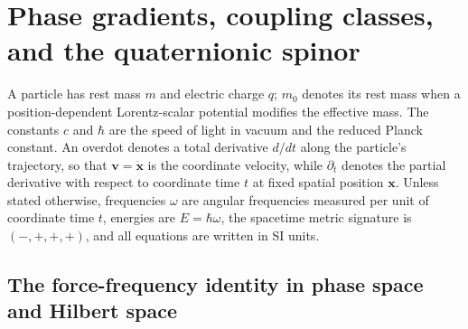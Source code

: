 \documentclass[aps,prd,onecolumn,tightenlines,nofootinbib,notitlepage,11pt,floatfix]{revtex4-2}
\theoremstyle{indentedtheorem}
\begin{document}
\section{Phase gradients, coupling classes, and the quaternionic spinor}
\label{sec:foundations}

A particle has rest mass $m$ and electric charge $q$; $m_0$ denotes its rest mass when a position-dependent Lorentz-scalar potential modifies the effective mass. The constants $c$ and $\hbar$ are the speed of light in vacuum and the reduced Planck constant. An overdot denotes a total derivative $d/dt$ along the particle's trajectory, so that $\mathbf{v}=\dot{\mathbf{x}}$ is the coordinate velocity, while $\partial_t$ denotes the partial derivative with respect to coordinate time $t$ at fixed spatial position $\mathbf{x}$. Unless stated otherwise, frequencies $\omega$ are angular frequencies measured per unit of coordinate time $t$, energies are $E=\hbar\omega$, the spacetime metric signature is $(-,+,+,+)$, and all equations are written in SI units.

\subsection{The force-frequency identity in phase space and Hilbert space}
\label{sec:sgm_summary}
\end{document}
